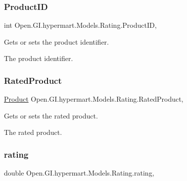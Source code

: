 \subsubsection{\texorpdfstring{Product\+ID}{ProductID}}
{\footnotesize\ttfamily int Open.\+G\+I.\+hypermart.\+Models.\+Rating.\+Product\+ID\hspace{0.3cm}{\ttfamily [get]}, {\ttfamily [set]}}



Gets or sets the product identifier. 

The product identifier. \hypertarget{class_open_1_1_g_i_1_1hypermart_1_1_models_1_1_rating_acf0485f546d4d61e33703627040247e8}{}\label{class_open_1_1_g_i_1_1hypermart_1_1_models_1_1_rating_acf0485f546d4d61e33703627040247e8} 
\subsubsection{\texorpdfstring{Rated\+Product}{RatedProduct}}
{\footnotesize\ttfamily \hyperlink{class_open_1_1_g_i_1_1hypermart_1_1_models_1_1_product}{Product} Open.\+G\+I.\+hypermart.\+Models.\+Rating.\+Rated\+Product\hspace{0.3cm}{\ttfamily [get]}, {\ttfamily [set]}}



Gets or sets the rated product. 

The rated product. \hypertarget{class_open_1_1_g_i_1_1hypermart_1_1_models_1_1_rating_a1090f6d360b3768ba5ad879befb798e0}{}\label{class_open_1_1_g_i_1_1hypermart_1_1_models_1_1_rating_a1090f6d360b3768ba5ad879befb798e0} 
\subsubsection{\texorpdfstring{rating}{rating}}
{\footnotesize\ttfamily double Open.\+G\+I.\+hypermart.\+Models.\+Rating.\+rating\hspace{0.3cm}{\ttfamily [get]}, {\ttfamily [set]}}



